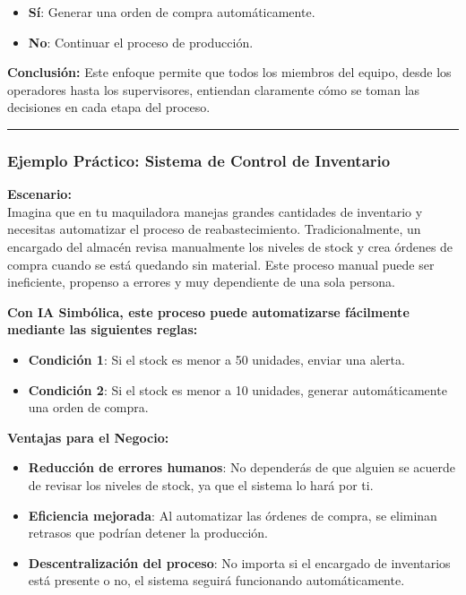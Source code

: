 \documentclass[
  10pt,
  letterpaper,
]{book}
\providecommand{\tightlist}{%
  \setlength{\itemsep}{0pt}\setlength{\parskip}{0pt}}\usepackage{longtable,booktabs,array}
\begin{document}
\begin{enumerate}
\begin{itemize}
    \begin{itemize}
    \tightlist
    \item
      \textbf{Sí}: Generar una orden de compra automáticamente.
    \item
      \textbf{No}: Continuar el proceso de producción.
    \end{itemize}
  \end{itemize}

  \textbf{Conclusión:} Este enfoque permite que todos los miembros del
  equipo, desde los operadores hasta los supervisores, entiendan
  claramente cómo se toman las decisiones en cada etapa del proceso.
\end{enumerate}

\begin{center}\rule{0.5\linewidth}{0.5pt}\end{center}

\subsubsection{Ejemplo Práctico: Sistema de Control de
Inventario}\label{ejemplo-pruxe1ctico-sistema-de-control-de-inventario}

\textbf{Escenario:}\\
Imagina que en tu maquiladora manejas grandes cantidades de inventario y
necesitas automatizar el proceso de reabastecimiento. Tradicionalmente,
un encargado del almacén revisa manualmente los niveles de stock y crea
órdenes de compra cuando se está quedando sin material. Este proceso
manual puede ser ineficiente, propenso a errores y muy dependiente de
una sola persona.

\textbf{Con IA Simbólica, este proceso puede automatizarse fácilmente
mediante las siguientes reglas:}

\begin{itemize}
\tightlist
\item
  \textbf{Condición 1}: Si el stock es menor a 50 unidades, enviar una
  alerta.
\item
  \textbf{Condición 2}: Si el stock es menor a 10 unidades, generar
  automáticamente una orden de compra.
\end{itemize}

\textbf{Ventajas para el Negocio:}

\begin{itemize}
\tightlist
\item
  \textbf{Reducción de errores humanos}: No dependerás de que alguien se
  acuerde de revisar los niveles de stock, ya que el sistema lo hará por
  ti.
\item
  \textbf{Eficiencia mejorada}: Al automatizar las órdenes de compra, se
  eliminan retrasos que podrían detener la producción.
\item
  \textbf{Descentralización del proceso}: No importa si el encargado de
  inventarios está presente o no, el sistema seguirá funcionando
  automáticamente.
\end{itemize}
\end{document}
